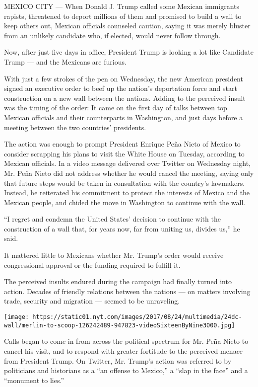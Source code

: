 MEXICO CITY --- When Donald J. Trump called some Mexican immigrants
rapists, threatened to deport millions of them and promised to build a
wall to keep others out, Mexican officials counseled caution, saying it
was merely bluster from an unlikely candidate who, if elected, would
never follow through.

Now, after just five days in office, President Trump is looking a lot
like Candidate Trump --- and the Mexicans are furious.

With just a few strokes of the pen on Wednesday, the new American
president signed an executive order to beef up the nation's deportation
force and start construction on a new wall between the nations. Adding
to the perceived insult was the timing of the order: It came on the
first day of talks between top Mexican officials and their counterparts
in Washington, and just days before a meeting between the two countries'
presidents.

The action was enough to prompt President Enrique Peña Nieto of Mexico
to consider scrapping his plans to visit the White House on Tuesday,
according to Mexican officials. In a video message delivered over
Twitter on Wednesday night, Mr. Peña Nieto did not address whether he
would cancel the meeting, saying only that future steps would be taken
in consultation with the country's lawmakers. Instead, he reiterated his
commitment to protect the interests of Mexico and the Mexican people,
and chided the move in Washington to continue with the wall.

``I regret and condemn the United States' decision to continue with the
construction of a wall that, for years now, far from uniting us, divides
us,'' he said.

It mattered little to Mexicans whether Mr. Trump's order would receive
congressional approval or the funding required to fulfill it.

The perceived insults endured during the campaign had finally turned
into action. Decades of friendly relations between the nations --- on
matters involving trade, security and migration --- seemed to be
unraveling.

\texttt{[image: https://static01.nyt.com/images/2017/08/24/multimedia/24dc-wall/merlin-to-scoop-126242489-947823-videoSixteenByNine3000.jpg]}

Calls began to come in from across the political spectrum for Mr. Peña
Nieto to cancel his visit, and to respond with greater fortitude to the
perceived menace from President Trump. On Twitter, Mr. Trump's action
was referred to by politicians and historians as a ``an offense to
Mexico,'' a ``slap in the face'' and a ``monument to lies.''


